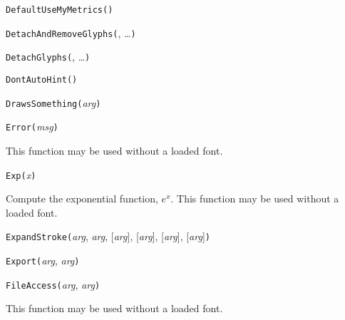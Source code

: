 

\texttt{DefaultUseMyMetrics(}\texttt{)}



\texttt{DetachAndRemoveGlyphs(}, \ldots\texttt{)}



\texttt{DetachGlyphs(}, \ldots\texttt{)}



\texttt{DontAutoHint(}\texttt{)}



\texttt{DrawsSomething(}\textit{arg}\texttt{)}



\texttt{Error(}\textit{msg}\texttt{)}

This function may be used without a loaded font.



\texttt{Exp(}\textit{x}\texttt{)}

Compute the exponential function, $e^x$.
This function may be used without a loaded font.



\texttt{ExpandStroke(}\textit{arg}, \textit{arg}, [\textit{arg}], [\textit{arg}], [\textit{arg}], [\textit{arg}]\texttt{)}



\texttt{Export(}\textit{arg}, \textit{arg}\texttt{)}



\texttt{FileAccess(}\textit{arg}, \textit{arg}\texttt{)}

This function may be used without a loaded font.

